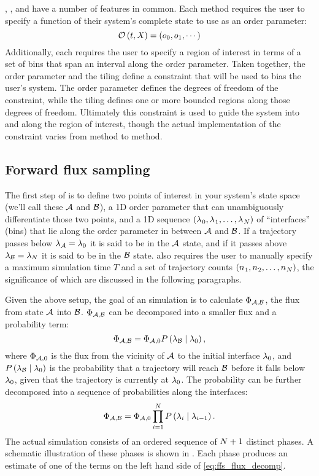 , , and  have a number of features in common. Each method requires the user to specify a function of their system's complete state to use as an order parameter:
\begin{equation*}
    \mathcal{O}_{} \left( t, X_{} \right) = \left( o_{0}, o_{1}, \cdots \right)
\end{equation*}
Additionally, each requires the user to specify a region of interest in terms of a set of bins that span an interval along the order parameter. Taken together, the order parameter and the tiling define a constraint that will be used to bias the user's system. The order parameter defines the degrees of freedom of the constraint, while the tiling defines one or more bounded regions along those degrees of freedom. Ultimately this constraint is used to guide the system into and along the region of interest, though the actual implementation of the constraint varies from method to method.

\subsection{Forward flux sampling}

The first step of  is to define two points of interest in your system's state space (we'll call these $\mathcal{A}$ and $\mathcal{B}$), a 1D order parameter that can unambiguously differentiate those two points, and a 1D sequence $\left( {{\lambda}_{}}_{0}, {{\lambda}_{}}_{1}, \dots, {{\lambda}_{}}_{N} \right)$ of ``interfaces'' (\ie bins) that lie along the order parameter in between $\mathcal{A}$ and $\mathcal{B}$. If a trajectory passes below ${\lambda}_{\mathcal{A}} = {\lambda}_{0}$ it is said to be in the $\mathcal{A}$ state, and if it passes above ${\lambda}_{\mathcal{B}} = {\lambda}_{N}$ it is said to be in the $\mathcal{B}$ state.  also requires the user to manually specify a maximum simulation time $T$ and a set of trajectory counts $\left( {n_{}}_{1}, {n_{}}_{2}, \dots, {n_{}}_{N} \right)$, the significance of which are discussed in the following paragraphs.

Given the above setup, the goal of an  simulation is to calculate $\Phi_{\mathcal{A}, \mathcal{B}}$, the flux from state $\mathcal{A}$ into $\mathcal{B}$. $\Phi_{\mathcal{A}, \mathcal{B}}$ can be decomposed into a smaller flux and a probability term:
\begin{equation*}
    \Phi_{\mathcal{A}, \mathcal{B}} = \Phi_{\mathcal{A}, 0} P\left(  {\lambda}_{\mathcal{B}} \mid {\lambda}_{0}  \right),
\end{equation*}
where $\Phi_{\mathcal{A}, 0}$ is the flux from the vicinity of $\mathcal{A}$ to the initial interface ${\lambda}_{0}$, and $P\left(  {\lambda}_{\mathcal{B}} \mid {\lambda}_{0}  \right)$ is the probability that a trajectory will reach $\mathcal{B}$ before it falls below ${\lambda}_{0}$, given that the trajectory is currently at ${\lambda}_{0}$. The probability can be further decomposed into a sequence of probabilities along the interfaces:
\begin{equation}\label{eq:ffs_flux_decomp}
    \Phi_{\mathcal{A}, \mathcal{B}} = \Phi_{\mathcal{A}, 0} \prod_{i=1}^{N} P\left(  {\lambda}_{i} \mid {\lambda}_{i - 1}  \right).
\end{equation}
The actual  simulation consists of an ordered sequence of $N + 1$ distinct phases. A schematic illustration of these phases is shown in . Each phase produces an estimate of one of the terms on the left hand side of \eqref{eq:ffs_flux_decomp}. 

